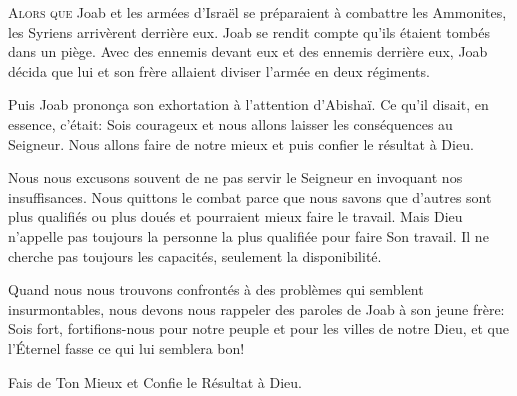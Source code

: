 \dvrule






\lettrine{A}{lors que} Joab et les armées d'Israël se préparaient
 à combattre les Ammonites, les Syriens arrivèrent derrière eux.
 Joab se rendit compte qu'ils étaient tombés dans un piège.
 Avec des ennemis devant eux et des ennemis derrière eux,
 Joab décida que lui et son frère allaient diviser
 l'armée en deux régiments. 

Puis Joab pronon\c{c}a son exhortation à l'attention d'Abishaï.
 Ce qu'il disait, en essence, c'était:
 \Og Sois courageux et nous allons laisser les conséquences au Seigneur.
 Nous allons faire de notre mieux et puis confier le résultat à Dieu. \Fg{}


Nous nous excusons souvent de ne pas servir le Seigneur
 en invoquant nos insuffisances. Nous quittons le combat parce que nous savons
 que d'autres sont plus qualifiés ou plus doués
 et pourraient mieux faire le travail.
 Mais Dieu n'appelle pas toujours la personne la plus qualifiée
 pour faire Son travail. Il ne cherche pas toujours les capacités,
 seulement la disponibilité. 

Quand nous nous trouvons confrontés à des problèmes
 qui semblent insurmontables, nous devons nous rappeler des paroles de Joab
 à son jeune frère:
 \Og Sois fort, fortifions-nous pour notre peuple
 et pour les villes de notre Dieu,
 et que l'Éternel fasse ce qui lui semblera bon! \Fg{}

Fais de Ton Mieux et Confie le Résultat à Dieu. 

\dvrule




